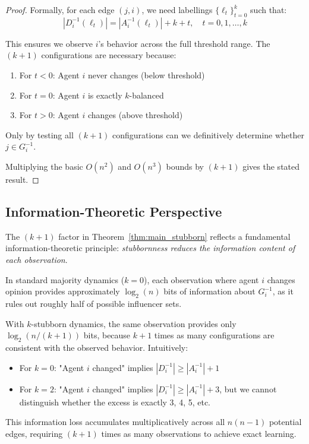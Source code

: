 \documentclass[conference]{IEEEtran}
\begin{document}
\begin{proof}
Formally, for each edge $(j,i)$, we need labellings $\{\ell_t\}_{t=0}^{k}$ such that:
\[
|D_i^{-1}(\ell_t)| = |A_i^{-1}(\ell_t)| + k + t, \quad t = 0, 1, \ldots, k
\]

This ensures we observe $i$'s behavior across the full threshold range. The $(k+1)$ configurations are necessary because:
\begin{enumerate}
\item For $t < 0$: Agent $i$ never changes (below threshold)
\item For $t = 0$: Agent $i$ is exactly $k$-balanced
\item For $t > 0$: Agent $i$ changes (above threshold)
\end{enumerate}

Only by testing all $(k+1)$ configurations can we definitively determine whether $j \in G_i^{-1}$.

Multiplying the basic $O(n^2)$ and $O(n^3)$ bounds by $(k+1)$ gives the stated result.
\end{proof}

\subsection{Information-Theoretic Perspective}
\label{subsec:info_theory}

The $(k+1)$ factor in Theorem~\ref{thm:main_stubborn} reflects a fundamental information-theoretic principle: \emph{stubbornness reduces the information content of each observation}.

In standard majority dynamics ($k=0$), each observation where agent $i$ changes opinion provides approximately $\log_2(n)$ bits of information about $G_i^{-1}$, as it rules out roughly half of possible influencer sets.

With $k$-stubborn dynamics, the same observation provides only $\log_2(n/(k+1))$ bits, because $k+1$ times as many configurations are consistent with the observed behavior. Intuitively:
\begin{itemize}
\item For $k=0$: "Agent $i$ changed" implies $|D_i^{-1}| \geq |A_i^{-1}| + 1$
\item For $k=2$: "Agent $i$ changed" implies $|D_i^{-1}| \geq |A_i^{-1}| + 3$, but we cannot distinguish whether the excess is exactly 3, 4, 5, etc.
\end{itemize}

This information loss accumulates multiplicatively across all $n(n-1)$ potential edges, requiring $(k+1)$ times as many observations to achieve exact learning.
\end{document}
